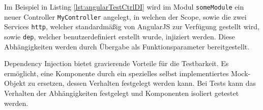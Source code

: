 Im Beispiel in Listing \ref{lst:angularTestCtrlDI} wird im Modul \texttt{someModule} ein neuer Controller \texttt{MyController} angelegt, in welchen der Scope, sowie die zwei Services \texttt{http}, welcher standardmäßig von AngularJS zur Verfügung gestellt wird, sowie \texttt{dep}, welcher benutzerdefiniert erstellt wurde, injiziert werden. Diese Abhängigkeiten werden durch Übergabe als Funktionsparameter bereitgestellt.

Dependency Injection bietet gravierende Vorteile für die Testbarkeit. Es ermöglicht, eine Komponente durch ein spezielles selbst implementiertes Mock-Objekt zu ersetzen, dessen Verhalten festgelegt werden kann. Bei Tests kann das Verhalten der Abhängigkeiten festgelegt und Komponenten isoliert getestet werden.\cite[][27]{angular-boehm}